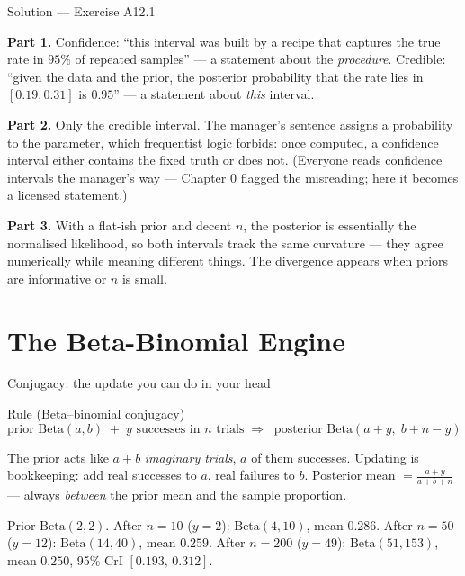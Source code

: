 \documentclass[aspectratio=169,11pt]{beamer}
\begin{document}
\begin{frame}{Solution --- Exercise A12.1}
  \begin{solutionbox}
    \footnotesize
    \textbf{Part 1.} Confidence: ``this interval was built by a recipe that
    captures the true rate in $95\%$ of repeated samples'' --- a statement about
    the \emph{procedure}. Credible: ``given the data and the prior, the posterior
    probability that the rate lies in $[0.19, 0.31]$ is $0.95$'' --- a statement
    about \emph{this} interval.
    \par\smallskip
    \textbf{Part 2.} Only the credible interval. The manager's sentence assigns a
    probability to the parameter, which frequentist logic forbids: once computed,
    a confidence interval either contains the fixed truth or does not. (Everyone
    reads confidence intervals the manager's way --- Chapter 0 flagged the
    misreading; here it becomes a licensed statement.)
    \par\smallskip
    \textbf{Part 3.} With a flat-ish prior and decent $n$, the posterior is
    essentially the normalised likelihood, so both intervals track the same
    curvature --- they agree numerically while meaning different things. The
    divergence appears when priors are informative or $n$ is small.
  \end{solutionbox}
\end{frame}

\section{The Beta-Binomial Engine}

\begin{frame}{Conjugacy: the update you can do in your head}
  \begin{block}{Rule (Beta--binomial conjugacy)}
    \[
      \text{prior } \text{Beta}(a, b)\; +\; y \text{ successes in } n \text{ trials}
      \;\Longrightarrow\;
      \boxed{\;\text{posterior } \text{Beta}(a + y,\; b + n - y)\;}
    \]
  \end{block}
  \begin{readme}
    \footnotesize
    The prior acts like $a + b$ \emph{imaginary trials}, $a$ of them successes.
    Updating is bookkeeping: add real successes to $a$, real failures to $b$.
    Posterior mean $= \frac{a + y}{a + b + n}$ --- always \emph{between} the prior
    mean and the sample proportion.
  \end{readme}
  \begin{numexample}[{{A conversion rate, true $p = 0.3$}}]
    Prior $\text{Beta}(2,2)$. After $n=10$ ($y=2$): $\text{Beta}(4,10)$, mean
    $0.286$. After $n=50$ ($y=12$): $\text{Beta}(14,40)$, mean $0.259$. After
    $n=200$ ($y=49$): $\text{Beta}(51,153)$, mean $0.250$, 95\% CrI
    $[0.193,\, 0.312]$.
  \end{numexample}
\end{frame}
\end{document}

